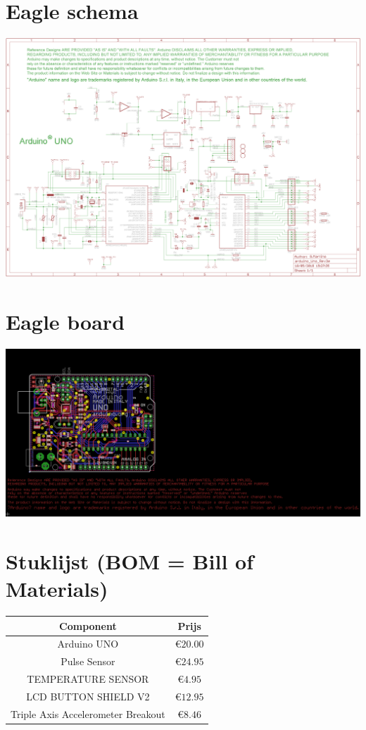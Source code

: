 \documentclass[a4paper]{report}
\begin{document}
    \section{Eagle schema}
        \includegraphics[width=\textwidth]{ArduinoUno_Schema}
        
    \section{Eagle board}
        \includegraphics[width=\textwidth]{ArduinoUno_Board}
        
    \section{Stuklijst (BOM = Bill of Materials)}
        \begin{tabular}{|c|c|}
            \hline
            Component & Prijs\\
            \hline
            Arduino UNO                        & \euro $20.00$\\
            Pulse Sensor                       & \euro $24.95$\\
            TEMPERATURE SENSOR                 & \euro $4.95$\\
            LCD BUTTON SHIELD V2               & \euro $12.95$\\
            Triple Axis Accelerometer Breakout & \euro $8.46$\\
            \hline
        \end{tabular}
        
\end{document}
